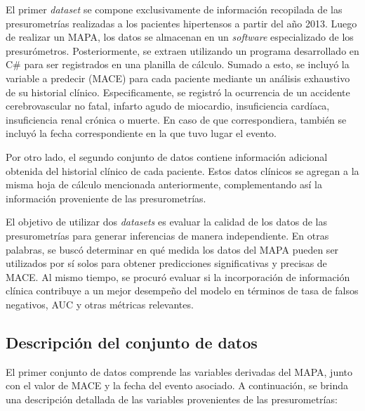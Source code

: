 El primer \emph{dataset} se compone exclusivamente de información recopilada de las 
presurometrías realizadas a los pacientes hipertensos a partir del año 2013. Luego 
de realizar un MAPA, los datos se almacenan en un \emph{software} especializado de 
los presurómetros. Posteriormente, se extraen utilizando un programa desarrollado 
en C\# para ser registrados en una planilla de cálculo. Sumado a esto, se incluyó 
la variable a predecir (MACE) para cada paciente mediante un análisis exhaustivo 
de su historial clínico. Especificamente, se registró la ocurrencia de 
un accidente cerebrovascular no fatal, infarto agudo de miocardio, insuficiencia 
cardíaca, insuficiencia renal crónica o muerte. En caso de que correspondiera, también 
se incluyó la fecha correspondiente en la que tuvo lugar el evento.

Por otro lado, el segundo conjunto de datos contiene información adicional obtenida 
del historial clínico de cada paciente. Estos datos clínicos se agregan a la misma 
hoja de cálculo mencionada anteriormente, complementando así la información proveniente 
de las presurometrías.

El objetivo de utilizar dos \emph{datasets} es evaluar la calidad de los datos de 
las presurometrías para generar inferencias de manera independiente. En otras palabras, 
se buscó determinar en qué medida los datos del MAPA pueden ser utilizados por sí solos 
para obtener predicciones significativas y precisas de MACE. Al mismo tiempo, se procuró 
evaluar si la incorporación de información clínica contribuye a un mejor desempeño del 
modelo en términos de tasa de falsos negativos, AUC y otras métricas relevantes.



\subsection{Descripción del conjunto de datos}

El primer conjunto de datos comprende las variables derivadas del MAPA, junto con 
el valor de MACE y la fecha del evento asociado. A continuación, se brinda una 
descripción detallada de las variables provenientes de las presurometrías: 


